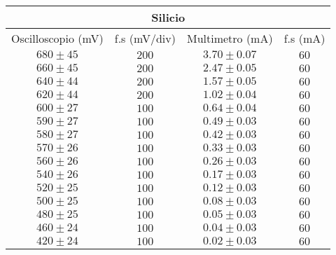 \documentclass[@MAIN@]{subfiles}
\begin{document}
    \begin{tabular}{ ||c|c|c|c|| }
        \hline
        \multicolumn{4}{||c||}{Silicio} \\
        \hline
        Oscilloscopio (mV) & f.s (mV/div) & Multimetro (mA) & f.s (mA) \\
        \hline
        $680\pm 45$        & $200$                & $3.70\pm0.07$   & $60$             \\
        \hline
        $660\pm 45$        & $200$                & $2.47\pm0.05$   & $60$             \\
        \hline
        $640\pm 44$        & $200$                & $1.57\pm0.05$   & $60$             \\
        \hline
        $620\pm 44$        & $200$                & $1.02\pm0.04$   & $60$             \\
        \hline
        $600\pm 27$        & $100$                & $0.64\pm0.04$   & $60$             \\
        \hline
        $590\pm 27$        & $100$                & $0.49\pm0.03$   & $60$             \\
        \hline
        $580\pm 27$        & $100$                & $0.42\pm0.03$   & $60$             \\
        \hline
        $570\pm 26$        & $100$                & $0.33\pm0.03$   & $60$             \\
        \hline
        $560\pm 26$        & $100$                & $0.26\pm0.03$   & $60$             \\
        \hline
        $540\pm 26$        & $100$                & $0.17\pm0.03$   & $60$             \\
        \hline
        $520\pm 25$        & $100$                & $0.12\pm0.03$   & $60$             \\
        \hline
        $500\pm 25$        & $100$                & $0.08\pm0.03$   & $60$             \\
        \hline
        $480\pm 25$        & $100$                & $0.05\pm0.03$   & $60$             \\
        \hline
        $460\pm 24$        & $100$                & $0.04\pm0.03$   & $60$             \\
        \hline
        $420\pm 24$        & $100$                & $0.02\pm0.03$   & $60$             \\
        \hline

    \end{tabular}
\end{document}
